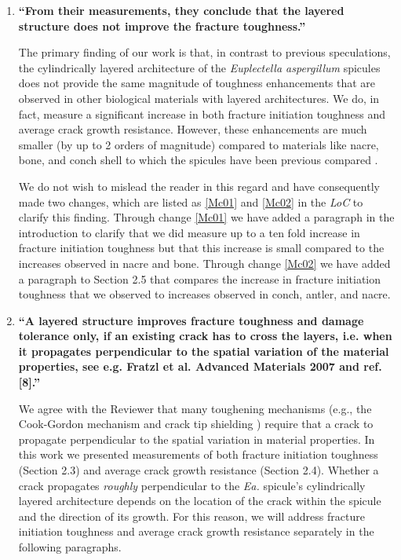 \documentclass[11pt,letterpaper]{report}
\makeatletter
\newcommand{\EA}{\textit{Ea.\@}\xspace}
\makeatother
\begin{document}
\begin{enumerate}[label=\textit{1.\arabic*},wide, labelwidth=!, labelindent=0pt]
\item \label{r1c1} {\bf ``From their measurements, they conclude that the layered structure does not improve the fracture toughness.''}

The primary finding of our work is that, in contrast to previous speculations, the cylindrically layered architecture of the \textit{Euplectella aspergillum} spicules does not provide the same magnitude of toughness enhancements that are observed in other biological materials with layered architectures. We do, in fact, measure a significant increase in both fracture initiation toughness and average crack growth resistance. However, these enhancements are much smaller (by up to 2 orders of magnitude) compared to materials like nacre, bone, and conch shell to which the spicules have been previous compared \cite{mayer2011new, mayer2005rigid}.

We do not wish to mislead the reader in this regard and have consequently made two changes, which are listed as \ref{Mc01} and \ref{Mc02} in the \textit{LoC} to clarify this finding.
%
Through change \ref{Mc01} we have added a paragraph in the introduction to clarify that we did measure up to a ten fold increase in fracture initiation toughness but that this increase is small compared to the increases observed in nacre and bone.
%
Through change \ref{Mc02} we have added a paragraph to Section 2.5 that compares the increase in fracture initiation toughness that we observed to increases observed in conch, antler, and nacre.

\item \label{r1c2} {\bf ``A layered structure improves fracture toughness and damage tolerance only, if an existing crack has to cross the layers, i.e. when it propagates perpendicular to the spatial variation of the material properties, see e.g. Fratzl et al. Advanced Materials 2007 and ref. [8].''}

We agree with the Reviewer that many toughening mechanisms (e.g., the Cook-Gordon mechanism \cite{cook1964mechanism} and crack tip shielding \cite{fratzl2007hindered}) require that a crack to propagate perpendicular to the spatial variation in material properties. In this work we presented measurements of both fracture initiation toughness (Section 2.3) and average crack growth resistance (Section 2.4). Whether a crack propagates \emph{roughly} perpendicular to the \EA spicule's cylindrically layered architecture depends on the location of the crack within the spicule and the direction of its growth. For this reason, we will address fracture initiation toughness and average crack growth resistance separately in the following paragraphs.


\end{enumerate}
\end{document}
